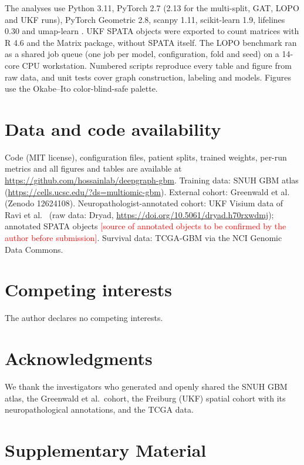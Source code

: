 \documentclass[11pt,letterpaper]{article}
\begin{document}
The analyses use Python 3.11, PyTorch 2.7 (2.13 for the multi-split, GAT, LOPO and UKF runs), PyTorch Geometric 2.8, scanpy 1.11, scikit-learn 1.9, lifelines 0.30 and umap-learn \cite{mcinnes2018}. UKF SPATA objects were exported to count matrices with R 4.6 and the Matrix package, without SPATA itself. The LOPO benchmark ran as a shared job queue (one job per model, configuration, fold and seed) on a 14-core CPU workstation. Numbered scripts reproduce every table and figure from raw data, and unit tests cover graph construction, labeling and models. Figures use the Okabe--Ito color-blind-safe palette.

\section*{Data and code availability}
Code (MIT license), configuration files, patient splits, trained weights, per-run metrics and all figures and tables are available at \url{https://github.com/hossainlab/deepgraph-gbm}. Training data: SNUH GBM atlas \cite{park2026} (\url{https://cells.ucsc.edu/?ds=multiomic-gbm}). External cohort: Greenwald et al.\ \cite{greenwald2024} (Zenodo 12624108). Neuropathologist-annotated cohort: UKF Visium data of Ravi et al.\ \cite{ravi2022} (raw data: Dryad, \url{https://doi.org/10.5061/dryad.h70rxwdmj}); annotated SPATA objects \textcolor{red}{[source of annotated objects to be confirmed by the author before submission]}. Survival data: TCGA-GBM via the NCI Genomic Data Commons.

\section*{Competing interests}
The author declares no competing interests.

\section*{Acknowledgments}
We thank the investigators who generated and openly shared the SNUH GBM atlas, the Greenwald et al.\ cohort, the Freiburg (UKF) spatial cohort with its neuropathological annotations, and the TCGA data.



\clearpage
\appendix
\section*{Supplementary Material}
\end{document}
